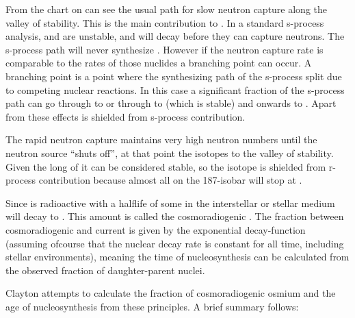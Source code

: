 \iffalse



From the chart on can see the usual path for slow neutron capture along the valley of stability.
This is the main contribution to . In a standard s-process analysis,  and  are unstable, and will decay before they can capture neutrons. The s-process path will never synthesize . However if the neutron capture rate is comparable to the \betadecay rates of those nuclides a branching point can occur. A branching point is a point where the synthesizing path of the s-process split due to competing nuclear reactions. In this case a significant fraction of the s-process path can go through  to  or through  to  (which is stable) and onwards to . Apart from these effects  is shielded from s-process contribution.

The rapid neutron capture maintains very high neutron numbers until the neutron source ``shuts off'', at that point the isotopes \betadecay to the valley of stability. Given the long \halflife of  it can be considered stable, so the  isotope is shielded from r-process contribution because almost all \betadecay on the 187-isobar will stop at .

Since  is radioactive with a halflife of  some  in the interstellar or stellar medium will decay to . This amount is called the cosmoradiogenic . The fraction between cosmoradiogenic  and current  is given by the exponential decay-function (assuming ofcourse that the nuclear decay rate is constant for all time, including stellar environments), meaning the time of nucleosynthesis can be calculated from the observed fraction of daughter-parent nuclei.

Clayton attempts to calculate the fraction of cosmoradiogenic osmium and the age of nucleosynthesis from these principles.
A brief summary follows:

